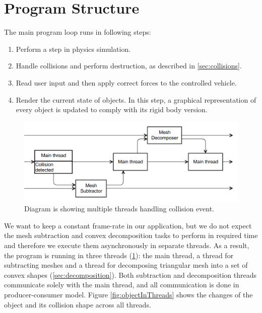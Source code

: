 \section{Program Structure}
\label{sec:structure}
The main program loop runs in following steps:
\begin{enumerate}
\item Perform a step in physics simulation.
\item Handle collisions and perform destruction, as described in  \cref{sec:collisions}.
\item Read user input and then apply correct forces to the controlled vehicle.
\item Render the current state of objects. In this step, a graphical representation of every object is updated to comply with its rigid body version.
\end{enumerate}

\begin{figure}
        \centering
        \includegraphics[width=\textwidth]{img/decompositionFlow}
        \caption{Diagram is showing multiple threads handling collision event. }
        \label{fig:threads}
\end{figure}

We want to keep a constant frame-rate in our application, but we do not  expect the mesh subtraction and convex decomposition tasks to perform in required time and therefore we execute them asynchronously in separate threads. As a result, the program is running in three threads (\cref{fig:threads}): the main thread, a thread for subtracting meshes and a thread for decomposing triangular mesh into a set of convex shapes (\cref{sec:decomposition}). Both subtraction and decomposition threads communicate solely with the main thread, and all communication is done in producer-consumer model. Figure \ref{fig:objectInThreads} shows the changes of the object and its collision shape across all threads.

